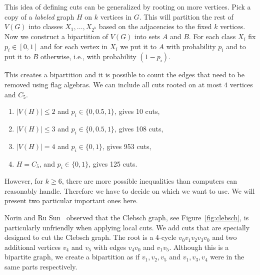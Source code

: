 \documentclass{svproc}
\begin{document}
This idea of defining cuts can be generalized by rooting on more vertices. 
Pick a copy of a \emph{labeled} graph $H$ on $k$ vertices in $G$. 
This will partition the rest of $V(G)$ into classes $X_1,\ldots,X_{2^k}$ based on the adjacencies to the fixed $k$ vertices.
Now we construct a bipartition of $V(G)$ into sets $A$ and $B$. For each class $X_i$ fix $p_i \in [0,1]$ and for each vertex in $X_i$ 
we put it to $A$ with probability $p_i$ and to put it to $B$ otherwise, i.e., with probability $(1-p_i)$.

This creates a bipartition and it is possible to count the edges that need to be removed using flag algebras. We can include all cuts rooted on at most $4$ vertices and $C_5$.
\begin{enumerate}
\item $|V(H)| \leq 2$ and $p_i \in \{0,0.5,1\}$, gives 10 cuts,
\item $|V(H)| \leq 3$ and $p_i \in \{0,0.5,1\}$, gives 108 cuts,
\item $|V(H)| = 4$ and $p_i \in \{0,1\}$, gives 953 cuts,
\item $H = C_5$,  and $p_i \in \{0,1\}$, gives 125 cuts.
\end{enumerate}
However, for $k\geq 6$, there are more possible inequalities than computers can reasonably handle. Therefore we have to decide on which we want to use. We will present two particular important ones here. 

Norin and Ru Sun~\cite{norin2016triangleindependent} observed that the Clebsch graph, see Figure~\ref{fig:clebsch}, is particularly unfriendly when applying local cuts. We add cuts that are specially designed to cut the Clebsch graph. %
The root is a 4-cycle $v_0v_1v_2v_3v_0$ and two additional vertices $v_4$ and $v_5$ with edges $v_4v_0$ and $v_1v_5$. Although this is a bipartite graph, we create a bipartition as if $v_1,v_2,v_5$ and $v_1,v_3,v_4$ were in the same parts respectively.                                        
\end{document}
